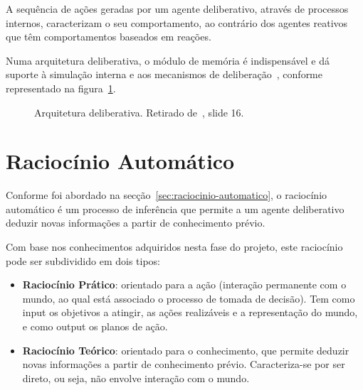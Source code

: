 A sequência de ações geradas por um agente deliberativo, através de processos internos, caracterizam o seu comportamento, ao contrário dos agentes reativos que têm comportamentos baseados em reações.

Numa arquitetura deliberativa, o módulo de memória é indispensável e dá suporte à simulação interna e aos mecanismos de deliberação~\cite{isel:iasa:slides:arq-agentes-deliberativos}, conforme representado na figura~\ref{fig:arquitetura-deliberativa}.

\begin{figure}[H]
    \begin{center}
    \end{center}
    \caption{Arquitetura deliberativa.
    Retirado de~\cite{isel:iasa:slides:arq-agentes-deliberativos}, slide 16.}
    \label{fig:arquitetura-deliberativa}
\end{figure}


\section{Raciocínio Automático}\label{sec:raciocinio-automatico-1}

Conforme foi abordado na secção~\ref{sec:raciocinio-automatico}, o raciocínio automático é um processo de inferência que permite a um agente deliberativo deduzir novas informações a partir de conhecimento prévio.

Com base nos conhecimentos adquiridos nesta fase do projeto, este raciocínio pode ser subdividido em dois tipos:

\begin{itemize}
    \item \textbf{Raciocínio Prático}: orientado para a ação (interação permanente com o mundo, ao qual está associado o processo de tomada de decisão).
    Tem como input os objetivos a atingir, as ações realizáveis e a representação do mundo, e como output os planos de ação.
    \item \textbf{Raciocínio Teórico}: orientado para o conhecimento, que permite deduzir novas informações a partir de conhecimento prévio.
    Caracteriza-se por ser direto, ou seja, não envolve interação com o mundo.
\end{itemize}

